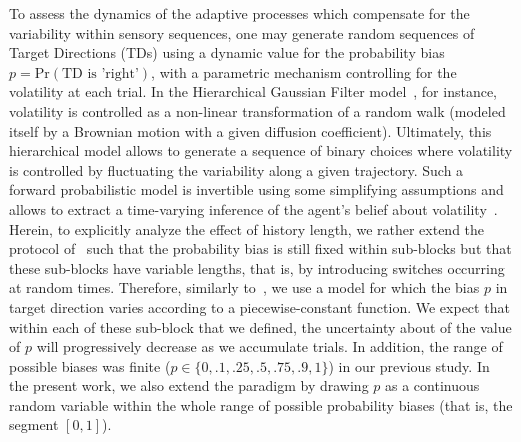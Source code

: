 \documentclass[10pt,letterpaper]{article}
\newcommand{\citep}[1]{\cite{#1}}
\newcommand{\citet}[1]{\cite{#1}}
\newcommand{\Rone}[1]{\textbf{\textcolor{magenta}{[rev 1: #1]}}}
\begin{document}
To assess the dynamics of the adaptive processes
which compensate for the variability within sensory sequences,
one may generate random sequences of Target Directions (TDs)
using a dynamic value for the probability bias $p = \text{Pr}(\text{TD is 'right'})$,
with a parametric mechanism controlling for the volatility at each trial.
In the Hierarchical Gaussian Filter model~\citep{Mathys11}, for instance,
volatility is controlled as a non-linear transformation
of a random walk (modeled itself by a Brownian motion with a given diffusion coefficient).
Ultimately, this hierarchical model allows to generate a sequence of binary choices
where volatility is controlled by fluctuating the variability along a given trajectory.
Such a forward probabilistic model is invertible
using some simplifying assumptions and allows
to extract a time-varying inference of the agent's belief about volatility~\citep{Vossel14}.
Herein, to explicitly analyze the effect of history length,
we rather extend the protocol of~\citet{Montagnini2010} such that the probability bias
is still fixed within sub-blocks but that these sub-blocks have variable lengths,
that is, by introducing switches occurring at random times.
Therefore, similarly to~\citet{Meyniel13}, we use a model for which
the bias $p$ in target direction varies according to a piecewise-constant function.
We expect that within each of these sub-block that we defined,
the uncertainty about of the value of $p$
will progressively decrease as we accumulate trials.
In addition, the range of possible biases was finite ($p \in \{0, .1, .25, .5, .75, .9, 1\}$) in our previous study.
In the present work, we also extend the paradigm
by drawing $p$ as a continuous random variable
within the whole range of possible probability biases (that is, the segment $[ 0, 1 ]$).
\end{document}
